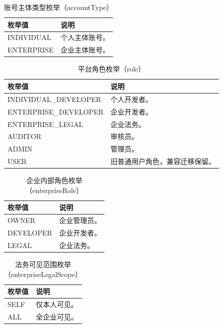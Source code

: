 \documentclass[UTF8,a4paper,12pt]{ctexart}
\begin{document}
\begin{table}[H]
  \centering
  \caption{账号主体类型枚举（accountType）}
  \begin{tabularx}{0.96\textwidth}{p{} Y}
    \toprule
    枚举值 & 说明 \\
    \midrule
    INDIVIDUAL & 个人主体账号。 \\
    ENTERPRISE & 企业主体账号。 \\
    \bottomrule
  \end{tabularx}
\end{table}

\begin{table}[H]
  \centering
  \caption{平台角色枚举（role）}
  \begin{tabularx}{0.96\textwidth}{p{} Y}
    \toprule
    枚举值 & 说明 \\
    \midrule
    INDIVIDUAL\_DEVELOPER & 个人开发者。 \\
    ENTERPRISE\_DEVELOPER & 企业开发者。 \\
    ENTERPRISE\_LEGAL & 企业法务。 \\
    AUDITOR & 审核员。 \\
    ADMIN & 管理员。 \\
    USER & 旧普通用户角色，兼容迁移保留。 \\
    \bottomrule
  \end{tabularx}
\end{table}

\begin{table}[H]
  \centering
  \caption{企业内部角色枚举（enterpriseRole）}
  \begin{tabularx}{0.96\textwidth}{p{} Y}
    \toprule
    枚举值 & 说明 \\
    \midrule
    OWNER & 企业管理员。 \\
    DEVELOPER & 企业开发者。 \\
    LEGAL & 企业法务。 \\
    \bottomrule
  \end{tabularx}
\end{table}

\begin{table}[H]
  \centering
  \caption{法务可见范围枚举（enterpriseLegalScope）}
  \begin{tabularx}{0.96\textwidth}{p{} Y}
    \toprule
    枚举值 & 说明 \\
    \midrule
    SELF & 仅本人可见。 \\
    ALL & 全企业可见。 \\
    \bottomrule
  \end{tabularx}
\end{table}
\end{document}
